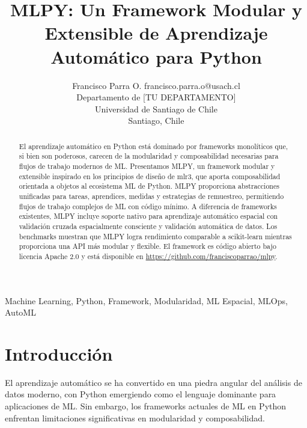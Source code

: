 \documentclass[twoside,11pt]{article}
\begin{document}
\title{MLPY: Un Framework Modular y Extensible de Aprendizaje Automático para Python}

\author{\name Francisco Parra O. \email francisco.parra.o@usach.cl \\
       \addr Departamento de [TU DEPARTAMENTO]\\
       Universidad de Santiago de Chile\\
       Santiago, Chile}


\maketitle

\begin{abstract}
El aprendizaje automático en Python está dominado por frameworks monolíticos que, si bien son poderosos, carecen de la modularidad y composabilidad necesarias para flujos de trabajo modernos de ML. Presentamos MLPY, un framework modular y extensible inspirado en los principios de diseño de mlr3, que aporta composabilidad orientada a objetos al ecosistema ML de Python. MLPY proporciona abstracciones unificadas para tareas, aprendices, medidas y estrategias de remuestreo, permitiendo flujos de trabajo complejos de ML con código mínimo. A diferencia de frameworks existentes, MLPY incluye soporte nativo para aprendizaje automático espacial con validación cruzada espacialmente consciente y validación automática de datos. Los benchmarks muestran que MLPY logra rendimiento comparable a scikit-learn mientras proporciona una API más modular y flexible. El framework es código abierto bajo licencia Apache 2.0 y está disponible en \url{https://github.com/franciscoparrao/mlpy}.
\end{abstract}

\begin{keywords}
  Machine Learning, Python, Framework, Modularidad, ML Espacial, MLOps, AutoML
\end{keywords}

\section{Introducción}
\label{sec:intro}

El aprendizaje automático se ha convertido en una piedra angular del análisis de datos moderno, con Python emergiendo como el lenguaje dominante para aplicaciones de ML. Sin embargo, los frameworks actuales de ML en Python enfrentan limitaciones significativas en modularidad y composabilidad.
\end{document}
